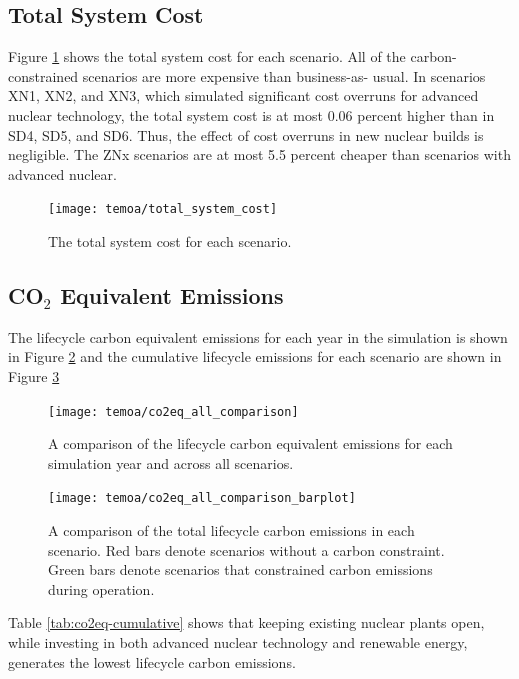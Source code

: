 \subsection{Total System Cost}
Figure \ref{fig:system-cost} shows the total system cost for each scenario.
All of the carbon-constrained scenarios are more expensive than business-as-
usual. In scenarios XN1, XN2, and XN3, which simulated significant cost overruns
for advanced nuclear technology, the total system cost is at most 0.06 percent
higher than in SD4, SD5, and SD6. Thus, the effect of cost overruns in new
nuclear builds is negligible. The ZNx scenarios are at most 5.5 percent cheaper
than scenarios with advanced nuclear. 

\begin{figure}[H]
  \centering
  \texttt{[image: temoa/total\_system\_cost]}
  \caption{The total system cost for each scenario.}
  \label{fig:system-cost}
\end{figure}

\subsection{CO$_2$ Equivalent Emissions}

The lifecycle carbon equivalent emissions for each year in the simulation is
shown in Figure \ref{fig:co2eq-all} and the cumulative lifecycle emissions
for each scenario are shown in Figure \ref{fig:co2eq-cumulative}

\begin{figure}[H]
  \texttt{[image: temoa/co2eq\_all\_comparison]}
  \caption{A comparison of the lifecycle carbon equivalent emissions for
  each simulation year and across all scenarios.}
  \label{fig:co2eq-all}
\end{figure}

\begin{figure}[H]
  \texttt{[image: temoa/co2eq\_all\_comparison\_barplot]}
  \caption{A comparison of the total lifecycle carbon emissions in each
  scenario. Red bars denote scenarios without a carbon constraint. Green bars
  denote scenarios that constrained carbon emissions during operation.}
  \label{fig:co2eq-cumulative}
\end{figure}

Table \ref{tab:co2eq-cumulative} shows that keeping existing nuclear
plants open, while investing in both advanced nuclear technology and renewable
energy, generates the lowest lifecycle carbon emissions.

